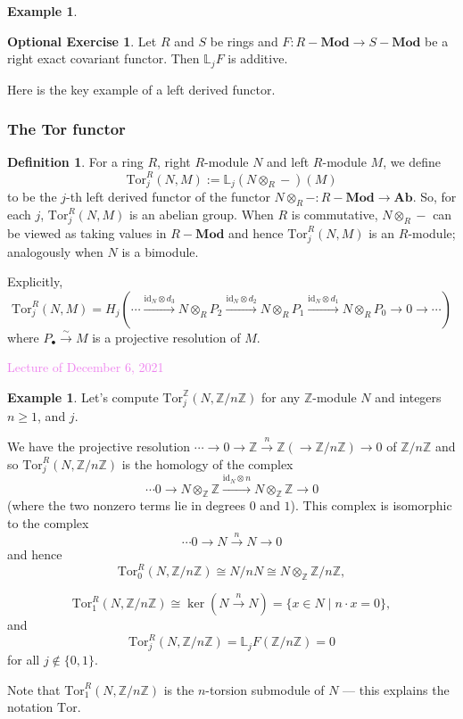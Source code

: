 \documentclass{amsart}[12pt]
\newcommand{\Tor}{\mathrm{Tor}}
\def\ker{\operatorname{ker}}
\newcommand{\id}{\mathrm{id}}
\newcommand{\Dec}[1]{\textcolor{violet}{Lecture of December #1, 2021}}
\newcommand{\bL}{{\mathbb{L}}}
\newcommand{\Z}{\mathbb{Z}}
\numberwithin{equation}{section}
\theoremstyle{plain} %
\theoremstyle{definition}
\newtheorem{defn}[equation]{Definition}
\newtheorem{ex}[equation]{Example}
\newtheorem{exer}[equation]{Optional Exercise}
\theoremstyle{remark}
\newcommand{\sssec}[1]{\subsubsection{#1}}
\newcommand{\xra}[1]{\xrightarrow{#1}}
\newcommand{\Ab}{\mathbf{Ab}}
\newcommand{\Mod}[1]{#1-\mathbf{Mod}}
\begin{document}
\begin{ex}
\begin{exer} 
Let $R$ and $S$ be rings and $F: \Mod{R} \to \Mod{S}$ be a right exact covariant functor. Then $\bL_j F$ is additive.
\end{exer}

Here is the key example of a left derived functor.

\sssec{The Tor functor}

\begin{defn}
For a ring $R$, right $R$-module $N$ and left $R$-module
  $M$, we define
$$
\Tor^R_j(N, M) := \bL_j (N \otimes_R -)(M)
$$
to be the $j$-th left derived functor of the functor $N \otimes_R -: \Mod{R} \to
\Ab$. So, for each $j$, $\Tor^R_j(N, M)$ is an abelian group. When $R$ is commutative, $N \otimes_R -$ can be viewed as taking values in $\Mod{R}$ and hence $\Tor^R_j(N, M)$ is an $R$-module; analogously when $N$ is a bimodule.
\end{defn}



Explicitly, 
$$
\Tor^R_j(N, M) = H_j( \cdots \xra{\id_N \otimes d_3} N \otimes_R P_2 \xra{\id_N \otimes d_2} N \otimes_R P_1
\xra{\id_N \otimes d_1} N \otimes_R P_0 \to 0 \to \cdots)
$$
where $P_\bullet \xra{\sim} M$ is a projective resolution of $M$. 

\Dec{6}

\begin{ex} 
Let's compute $\Tor^\Z_j(N, \Z/n\Z)$ for any $\Z$-module $N$ and integers $n \geq 1$, and $j$. 

We have the projective resolution $\cdots \to 0 \to \Z \xra{n} \Z (\to \Z/n\Z) \to 0$ of $\Z/n\Z$ and so $\Tor^R_j(N,\Z/n\Z)$ is the homology of the complex
$$
\cdots 0 \to N \otimes_\Z \Z \xra{\id_N \otimes n} N \otimes_\Z \Z \to 0
$$
 (where the two nonzero terms lie in degrees $0$ and $1$).  This complex is isomorphic to the complex
$$
\cdots 0 \to N \xra{n} N  \to 0
$$
and hence
$$
\Tor_0^R(N, \Z/n\Z) \cong N/nN \cong N \otimes_\Z \Z/n\Z,
$$

$$
\Tor_1^R(N, \Z/n\Z) \cong \ker(N \xra{n} N) = \{x \in N \mid n \cdot x = 0\},
$$
and
$$
\Tor_j^R(N, \Z/n\Z) = \bL_j F(\Z/n\Z) = 0
$$
for all $j \notin \{0,1\}$.

Note that $\Tor_1^R(N, \Z/n\Z)$ is the $n$-torsion submodule of $N$ --- this explains the notation $\Tor$.
\end{ex}




\end{ex}
\end{document}
